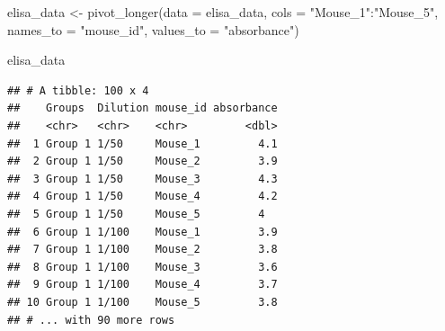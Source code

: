 \documentclass[
]{book}
\newenvironment{Shaded}{\begin{snugshade}}{\end{snugshade}}
\newcommand{\AttributeTok}[1]{\textcolor[rgb]{0.77,0.63,0.00}{#1}}
\newcommand{\CommentTok}[1]{\textcolor[rgb]{0.56,0.35,0.01}{\textit{#1}}}
\newcommand{\FunctionTok}[1]{\textcolor[rgb]{0.00,0.00,0.00}{#1}}
\newcommand{\NormalTok}[1]{#1}
\newcommand{\OtherTok}[1]{\textcolor[rgb]{0.56,0.35,0.01}{#1}}
\newcommand{\SpecialCharTok}[1]{\textcolor[rgb]{0.00,0.00,0.00}{#1}}
\newcommand{\StringTok}[1]{\textcolor[rgb]{0.31,0.60,0.02}{#1}}
\begin{document}
\begin{Shaded}
\begin{Highlighting}[]
\NormalTok{elisa\_data }\OtherTok{\textless{}{-}} \FunctionTok{pivot\_longer}\NormalTok{(}\AttributeTok{data =}\NormalTok{ elisa\_data, }\AttributeTok{cols =} \StringTok{"Mouse\_1"}\SpecialCharTok{:}\StringTok{"Mouse\_5"}\NormalTok{, }\AttributeTok{names\_to =} \StringTok{"mouse\_id"}\NormalTok{, }\AttributeTok{values\_to =} \StringTok{"absorbance"}\NormalTok{)}

\NormalTok{elisa\_data}
\end{Highlighting}
\end{Shaded}

\begin{verbatim}
## # A tibble: 100 x 4
##    Groups  Dilution mouse_id absorbance
##    <chr>   <chr>    <chr>         <dbl>
##  1 Group 1 1/50     Mouse_1         4.1
##  2 Group 1 1/50     Mouse_2         3.9
##  3 Group 1 1/50     Mouse_3         4.3
##  4 Group 1 1/50     Mouse_4         4.2
##  5 Group 1 1/50     Mouse_5         4  
##  6 Group 1 1/100    Mouse_1         3.9
##  7 Group 1 1/100    Mouse_2         3.8
##  8 Group 1 1/100    Mouse_3         3.6
##  9 Group 1 1/100    Mouse_4         3.7
## 10 Group 1 1/100    Mouse_5         3.8
## # ... with 90 more rows
\end{verbatim}

\begin{Shaded}
\end{Shaded}
\end{document}
